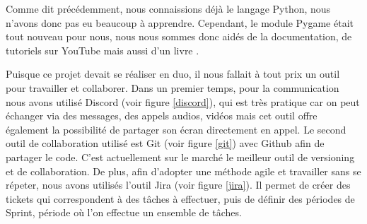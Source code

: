 \documentclass[12pt]{article}
\begin{document}
Comme dit précédemment, nous connaissions déjà le langage Python, nous n'avons donc pas eu beaucoup à apprendre. Cependant, le module Pygame était tout nouveau pour nous, nous nous sommes donc aidés de la documentation, de tutoriels sur YouTube mais aussi d'un livre \cite{prieur2019pygame}.\par
Puisque ce projet devait se réaliser en duo, il nous fallait à tout prix un outil pour travailler et collaborer. Dans un premier temps, pour la communication nous avons utilisé Discord (voir figure \ref{discord}), qui est très pratique car on peut échanger via des messages, des appels audios, vidéos mais cet outil offre également la possibilité de partager son écran directement en appel. Le second outil de collaboration utilisé est Git (voir figure \ref{git}) avec Github afin de partager le code. C'est actuellement sur le marché le meilleur outil de versioning et de collaboration. De plus, afin d'adopter une méthode agile et travailler sans se répeter, nous avons utilisés l'outil Jira (voir figure \ref{jira}). Il permet de créer des tickets qui correspondent à des tâches à effectuer, puis de définir des périodes de Sprint, période où l'on effectue un ensemble de tâches.
\end{document}
